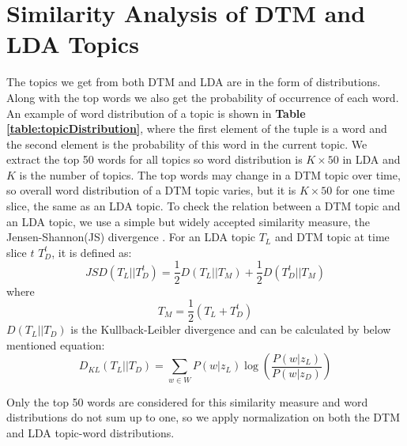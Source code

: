 \chapter{Similarity Analysis of DTM and LDA Topics}
The topics we get from both DTM and LDA are in the form of distributions. Along with the top words we also get the probability of occurrence of each word. An example of word distribution of a topic is shown in \textbf{Table \ref{table:topicDistribution}}, where the first element of the tuple is a word and the second element is the probability of this word in the current topic. We extract the top 50 words for all topics so word distribution is $K \times 50$ in LDA and $K$ is the number of topics. The top words may change in a DTM topic over time, so overall word distribution of a DTM topic varies, but it is $K \times 50 $ for one time slice, the same as an LDA topic. To check the relation between a DTM topic and an LDA topic, we use a simple but widely accepted similarity measure, the Jensen-Shannon(JS) divergence \cite{lin1991divergence}. For an LDA topic $T_{L}$ and DTM topic at time slice $t$ $T_{D}^t$, it is defined as:
\begin{equation}
JSD(T_L || T_D^t) = \frac{1}{2} D(T_L || T_{M}) + \frac{1}{2} D(T_D^t || T_{M})
 \end{equation}
 where
 \begin{equation}
  T_M = \frac{1}{2}(T_L + T_D^t)
 \end{equation}
 $D(T_L || T_{D})$ is the Kullback-Leibler divergence and can be calculated by below mentioned equation:
 \begin{equation}
D_{KL}(T_L || T_{D})  =  \sum_{w \in W} P(w| z_L) \log(\frac{P(w| z_L)}{P(w| z_D)})
 \end{equation}

 Only the top 50 words are considered for this similarity measure and word distributions do not sum up to one, so we apply normalization on both the DTM and LDA topic-word distributions.

